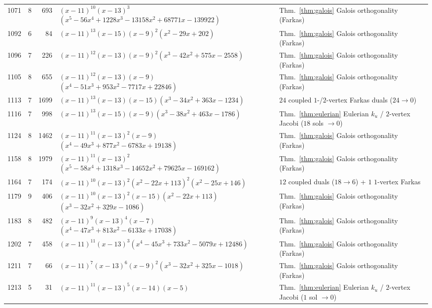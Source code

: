 \documentclass[11pt,reqno]{amsart}
\theoremstyle{definition}
\theoremstyle{remark}
\numberwithin{equation}{section}
\numberwithin{table}{section}
\begin{document}
{\begin{longtable}{@{}rrr>{\raggedright\arraybackslash}p{2.45in}>{\raggedright\arraybackslash}p{2.35in}@{}}
1071 & 8 & 693 & $(x-11)^{10}$\allowbreak $(x-13)^3$\allowbreak $(x^5-56x^4+1228x^3-13158x^2+68771x-139922)$ & Thm.~\ref{thm:galois} Galois orthogonality (Farkas) \\
1092 & 6 & 84 & $(x-11)^{13}$\allowbreak $(x-15)$\allowbreak $(x-9)^2$\allowbreak $(x^2-29x+202)$ & Thm.~\ref{thm:galois} Galois orthogonality (Farkas) \\
1096 & 7 & 226 & $(x-11)^{12}$\allowbreak $(x-13)$\allowbreak $(x-9)^2$\allowbreak $(x^3-42x^2+575x-2558)$ & Thm.~\ref{thm:galois} Galois orthogonality (Farkas) \\
1105 & 8 & 655 & $(x-11)^{12}$\allowbreak $(x-13)$\allowbreak $(x-9)$\allowbreak $(x^4-51x^3+953x^2-7717x+22846)$ & Thm.~\ref{thm:galois} Galois orthogonality (Farkas) \\
1113 & 7 & 1699 & $(x-11)^{13}$\allowbreak $(x-13)$\allowbreak $(x-15)$\allowbreak $(x^3-34x^2+363x-1234)$ & $24$ coupled $1$-/$2$-vertex Farkas duals ($24\to 0$) \\
1116 & 7 & 998 & $(x-11)^{13}$\allowbreak $(x-15)$\allowbreak $(x-9)$\allowbreak $(x^3-38x^2+463x-1786)$ & Thm.~\ref{thm:eulerian} Eulerian $k_u$ / $2$-vertex Jacobi ($18$ sols $\to 0$) \\
1124 & 8 & 1462 & $(x-11)^{11}$\allowbreak $(x-13)^2$\allowbreak $(x-9)$\allowbreak $(x^4-49x^3+877x^2-6783x+19138)$ & Thm.~\ref{thm:galois} Galois orthogonality (Farkas) \\
1158 & 8 & 1979 & $(x-11)^{11}$\allowbreak $(x-13)^2$\allowbreak $(x^5-58x^4+1318x^3-14652x^2+79625x-169162)$ & Thm.~\ref{thm:galois} Galois orthogonality (Farkas) \\
1164 & 7 & 174 & $(x-11)^{10}$\allowbreak $(x-13)^2$\allowbreak $(x^2-22x+113)^2$\allowbreak $(x^2-25x+146)$ & $12$ coupled duals ($18\to 6$) + $1$ $1$-vertex Farkas \\
1179 & 9 & 406 & $(x-11)^{10}$\allowbreak $(x-13)^2$\allowbreak $(x-15)$\allowbreak $(x^2-22x+113)$\allowbreak $(x^3-32x^2+329x-1086)$ & Thm.~\ref{thm:galois} Galois orthogonality (Farkas) \\
1183 & 8 & 482 & $(x-11)^9$\allowbreak $(x-13)^4$\allowbreak $(x-7)$\allowbreak $(x^4-47x^3+813x^2-6133x+17038)$ & Thm.~\ref{thm:galois} Galois orthogonality (Farkas) \\
1202 & 7 & 458 & $(x-11)^{11}$\allowbreak $(x-13)^3$\allowbreak $(x^4-45x^3+733x^2-5079x+12486)$ & Thm.~\ref{thm:galois} Galois orthogonality (Farkas) \\
1211 & 7 & 66 & $(x-11)^7$\allowbreak $(x-13)^6$\allowbreak $(x-9)^2$\allowbreak $(x^3-32x^2+325x-1018)$ & Thm.~\ref{thm:galois} Galois orthogonality (Farkas) \\
1213 & 5 & 31 & $(x-11)^{11}$\allowbreak $(x-13)^5$\allowbreak $(x-14)$\allowbreak $(x-5)$ & Thm.~\ref{thm:eulerian} Eulerian $k_u$ / $2$-vertex Jacobi ($1$ sol $\to 0$) \\
\end{longtable}
}
\end{document}
